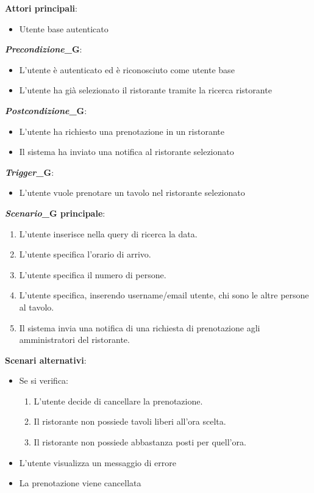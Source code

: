 \textbf{Attori principali}:
\begin{itemize}
    \item Utente base autenticato
\end{itemize}
\textbf{\textit{Precondizione}_G}:
\begin{itemize}
    \item L'utente è autenticato ed è riconosciuto come utente base
    \item L'utente ha già selezionato il ristorante tramite la ricerca ristorante 
\end{itemize}
\textbf{\textit{Postcondizione}_G}:
\begin{itemize}
    \item L'utente ha richiesto una prenotazione in un ristorante
    \item Il sistema ha inviato una notifica al ristorante selezionato
\end{itemize}
\textbf{\textit{Trigger}_G}:
\begin{itemize}
    \item L'utente vuole prenotare un tavolo nel ristorante selezionato
\end{itemize}
\textbf{\textit{Scenario}_G principale}:
\begin{enumerate}
    \item L'utente inserisce nella query di ricerca la data.
    \item L'utente specifica l'orario di arrivo.
    \item L'utente specifica il numero di persone.
    \item L'utente specifica, inserendo username/email utente, chi sono le altre persone al tavolo.
    \item Il sistema invia una notifica di una richiesta di prenotazione agli amministratori del ristorante.
\end{enumerate}
\textbf{Scenari alternativi}:
\begin{itemize}
    \item Se si verifica:
    \begin{enumerate}
        \item L'utente decide di cancellare la prenotazione.
        \item Il ristorante non possiede tavoli liberi all'ora scelta.
        \item Il ristorante non possiede abbastanza posti per quell'ora.
    \end{enumerate}
    \item L'utente visualizza un messaggio di errore
    \item La prenotazione viene cancellata
\end{itemize}



